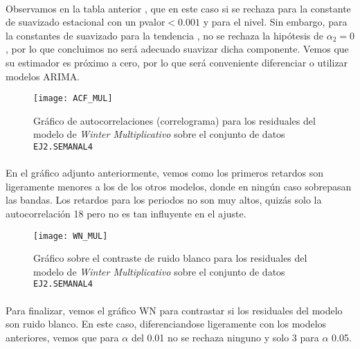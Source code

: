 \documentclass[a4paper, spanish]{article}
\begin{document}
      \paragraph{}
      Observamos en la tabla anterior , que en este caso si se rechaza para la constante de suavizado estacional con un pvalor$ <0.001$ y para el nivel. Sin embargo, para la constantes de suavizado para la tendencia , no se rechaza la hipótesis de $\alpha_2 =0$, por lo que concluimos no será adecuado suavizar dicha componente. Vemos que su estimador es próximo a cero, por lo que será conveniente diferenciar o utilizar modelos ARIMA.

      \begin{figure}[htb!]
        \centering
        \texttt{[image: ACF\_MUL]}
        \caption{Gráfico de autocorrelaciones (correlograma) para los residuales del modelo de \emph{Winter Multiplicativo} sobre el conjunto de datos \texttt{EJ2.SEMANAL4}}
        \label{img:b_winter_multiplicative_residuals_correlogram}
      \end{figure}

      \paragraph{}
      En el gráfico adjunto anteriormente, vemos como los primeros retardos son ligeramente menores a los de los otros modelos, donde en ningún caso sobrepasan las bandas. Los retardos para los periodos no son muy altos, quizás solo la autocorrelación 18 pero no es tan influyente en el ajuste.

      \begin{figure}[htb!]
        \centering
        \texttt{[image: WN\_MUL]}
        \caption{Gráfico sobre el contraste de ruido blanco para los residuales del modelo de \emph{Winter Multiplicativo} sobre el conjunto de datos \texttt{EJ2.SEMANAL4}}
        \label{img:b_winter_multplicative_test_white_noise}
      \end{figure}

      \paragraph{}
      Para finalizar, vemos el gráfico WN para contrastar si los residuales del modelo son ruido blanco. En este caso, diferenciandose ligeramente con los modelos anteriores, vemos que para $\alpha$ del 0.01 no se rechaza ninguno y solo 3 para $\alpha$ 0.05.
\end{document}
